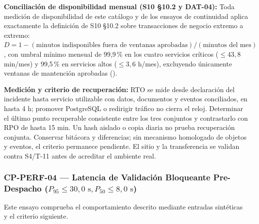 \par\noindent\textbf{Conciliación de disponibilidad mensual (S10 §10.2 y DAT-04):} Toda medición de disponibilidad de este catálogo y de los ensayos de continuidad aplica exactamente la definición de S10 §10.2 sobre transacciones de negocio extremo a extremo: \(D = 1 - (\text{minutos indisponibles fuera de ventanas aprobadas}) / (\text{minutos del mes})\), con umbral mínimo mensual de 99,9\,\% en los cuatro servicios críticos ($\le 43{,}8$ min/mes) y 99,5\,\% en servicios altos ($\le 3{,}6$ h/mes), excluyendo únicamente ventanas de mantención aprobadas ().\par

\par\noindent\textbf{Medición y criterio de recuperación:} RTO se mide desde declaración del incidente hasta servicio utilizable con datos, documentos y eventos conciliados, en hasta 4 h; promover PostgreSQL o redirigir tráfico no cierra el reloj. Determinar el último punto recuperable consistente entre los tres conjuntos y contrastarlo con RPO de hasta 15 min. Un hash aislado o copia diaria no prueba recuperación conjunta. Conservar bitácora y diferencias; sin mecanismo homologado de objetos y eventos, el criterio permanece pendiente. El sitio y la transferencia se validan contra S4/T-11 antes de acreditar el ambiente real.\par

\subsubsection*{CP-PERF-04 — Latencia de Validación Bloqueante Pre-Despacho ($P_{95} \le 30{,}0\text{ s}, P_{50} \le 8{,}0\text{ s}$)}\label{sec:9-cp-perf-04}
Este ensayo comprueba el comportamiento descrito mediante entradas sintéticas y el criterio siguiente.

